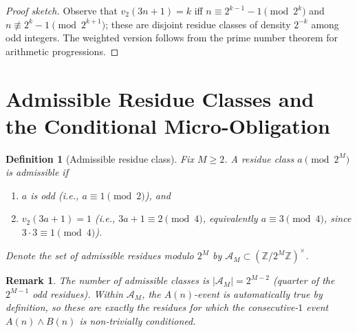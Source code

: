 \documentclass[11pt,a4paper]{article}
\newcommand{\vt}[1]{v_2\!\left(#1\right)}          %
\newtheorem{definition}[theorem]{Definition}
\newtheorem{remark}[theorem]{Remark}
\begin{document}
\begin{proof}[Proof sketch]
Observe that $\vt{3n+1} = k$ iff $n \equiv 2^{k-1}-1 \pmod{2^k}$ and
$n \not\equiv 2^{k}-1 \pmod{2^{k+1}}$; these are disjoint residue classes of
density $2^{-k}$ among odd integers.  The weighted version follows from
the prime number theorem for arithmetic progressions.
\end{proof}

\section{Admissible Residue Classes and the Conditional Micro-Obligation}

\begin{definition}[Admissible residue class]\label{def:admissible}
Fix $M \ge 2$.  A residue class $a \pmod{2^M}$ is \emph{admissible} if
\begin{enumerate}
  \item $a$ is odd (i.e., $a \equiv 1 \pmod 2$), and
  \item $\vt{3a+1} = 1$ (i.e., $3a+1 \equiv 2 \pmod{4}$, equivalently
        $a \equiv 3 \pmod 4$, since $3 \cdot 3 \equiv 1 \pmod 4$).
\end{enumerate}
Denote the set of admissible residues modulo $2^M$ by
$\mathcal{A}_M \subset (\mathbb{Z}/2^M\mathbb{Z})^{\times}$.
\end{definition}

\begin{remark}
The number of admissible classes is $|\mathcal{A}_M| = 2^{M-2}$ (quarter of the
$2^{M-1}$ odd residues).  Within $\mathcal{A}_M$, the $A(n)$-event is
automatically true by definition, so these are exactly the residues for which
the consecutive-$1$ event $A(n) \land B(n)$ is non-trivially conditioned.
\end{remark}
\end{document}
